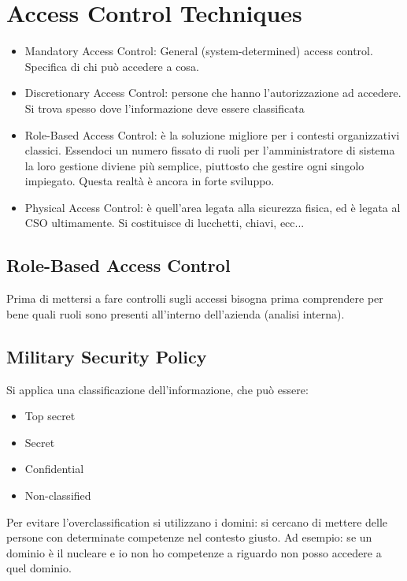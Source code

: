 \chapter{Access Control Techniques}
\label{AccessControlTechniques}
\begin{itemize}
 \item Mandatory Access Control: General (system-determined) access control.
 Specifica di chi può accedere a cosa.
 \item Discretionary Access Control: persone che hanno l'autorizzazione ad
 accedere. Si trova spesso dove l'informazione deve essere classificata
 \item Role-Based Access Control: è la soluzione migliore per i contesti
 organizzativi classici. Essendoci un numero fissato di ruoli per
 l'amministratore di sistema la loro gestione diviene più semplice, piuttosto
che gestire ogni singolo impiegato. Questa realtà è ancora in forte sviluppo.
 \item Physical Access Control: è quell'area legata alla sicurezza fisica, ed è
 legata al CSO ultimamente. Si costituisce di lucchetti, chiavi, ecc...
\end{itemize}


\section{Role-Based Access Control}

Prima di mettersi a fare controlli sugli accessi bisogna prima comprendere per
bene quali ruoli sono presenti all'interno dell'azienda (analisi interna).


\section{Military Security Policy}

Si applica una classificazione dell'informazione, che può essere:
\begin{itemize}
 \item Top secret
 \item Secret
 \item Confidential
 \item Non-classified

\end{itemize}

Per evitare l'overclassification si utilizzano i domini: si cercano di mettere
delle persone con determinate competenze nel contesto giusto.
Ad esempio: se un dominio è il nucleare e io non ho competenze a riguardo non
posso accedere a quel dominio.

